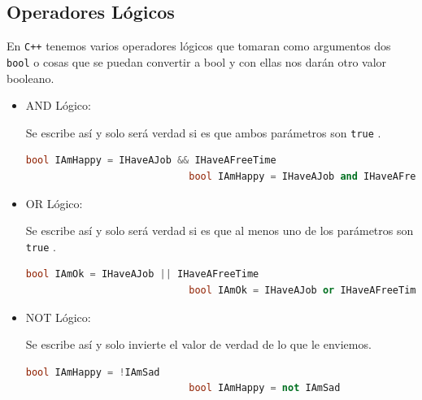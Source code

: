 \documentclass[12pt, fleqn]{report}                             %
\theoremstyle{break}                                            %
\newcommand{\textCode}[1]  { \texttt{#1} }                      %
\newcommand{\Cpp}{\ignorespaces\textCode{C++}}                  %
\begin{document}
            \subsection{Operadores Lógicos}

                En \Cpp tenemos varios operadores lógicos que tomaran como argumentos dos 
                \textCode{bool} o cosas que se puedan convertir a bool y con ellas nos darán otro
                valor booleano.

                \begin{itemize}
                    \item AND Lógico: 
                    
                        Se escribe así y solo será verdad si es que ambos parámetros son \textCode{true}.
                        \begin{lstlisting}[language=C++, gobble=28]
                            bool IAmHappy = IHaveAJob && IHaveAFreeTime 
                            bool IAmHappy = IHaveAJob and IHaveAFreeTime
                        \end{lstlisting}

                    \item OR Lógico: 
                    
                        Se escribe así y solo será verdad si es que al menos uno de los parámetros son \textCode{true}.
                        \begin{lstlisting}[language=C++, gobble=28]
                            bool IAmOk = IHaveAJob || IHaveAFreeTime 
                            bool IAmOk = IHaveAJob or IHaveAFreeTime
                        \end{lstlisting}

                    \item NOT Lógico: 
                    
                        Se escribe así y solo invierte el valor de verdad de lo que le enviemos.
                        \begin{lstlisting}[language=C++, gobble=28]
                            bool IAmHappy = !IAmSad
                            bool IAmHappy = not IAmSad
                        \end{lstlisting}

                \end{itemize}
\end{document}
